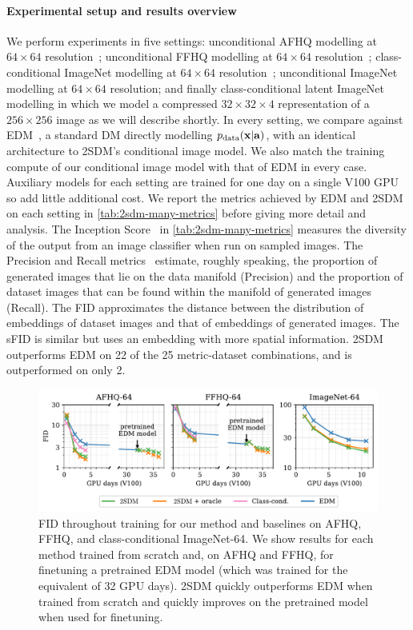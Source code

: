 \paragraph{Experimental setup and results overview}

We perform experiments in five settings: unconditional AFHQ modelling at $64\times64$ resolution~\citep{choi2020stargan}; unconditional FFHQ modelling at $64\times64$ resolution~\citep{karras2018style}; class-conditional ImageNet modelling at $64\times64$ resolution~\citep{deng2009imagenet}; unconditional ImageNet modelling at $64\times64$ resolution; and finally class-conditional latent ImageNet modelling in which we model a compressed $32\times32\times4$ representation of a $256\times256$ image as we will describe shortly. In every setting, we compare against EDM~\citep{karras2022elucidating}, a standard DM directly modelling $p_{\rm{data}}({\mathbf{x}}|{\mathbf{a}})$, with an identical architecture to 2SDM's conditional image model. We also match the training compute of our conditional image model with that of EDM in every case. Auxiliary models for each setting are trained for one day on a single V100 GPU so add little additional cost. We report the metrics achieved by EDM and 2SDM on each setting in \cref{tab:2sdm-many-metrics} before giving more detail and analysis. The Inception Score~\citep{salimans2016improved,barratt2018note} in \cref{tab:2sdm-many-metrics} measures the diversity of the output from an image classifier when run on sampled images. The Precision and Recall metrics~\citep{kynkaanniemi2019improved} estimate, roughly speaking, the proportion of generated images that lie on the data manifold (Precision) and the proportion of dataset images that can be found within the manifold of generated images (Recall). The FID approximates the distance between the distribution of embeddings of dataset images and that of embeddings of generated images. The sFID is similar but uses an embedding with more spatial information. 2SDM outperforms EDM on 22 of the 25 metric-dataset combinations, and is outperformed on only 2.


\begin{figure}[t]
    \centering
    \includegraphics[width=\textwidth]{figs/2sdm/cond-results-1.pdf}
    \caption{FID throughout training for our method and baselines on AFHQ, FFHQ, and class-conditional ImageNet-64. We show results for each method trained from scratch and, on AFHQ and FFHQ, for finetuning a pretrained EDM model (which was trained for the equivalent of 32 GPU days). 2SDM quickly outperforms EDM when trained from scratch and quickly improves on the pretrained model when used for finetuning.}
    \label{fig:fid_vs_training}
\end{figure}


